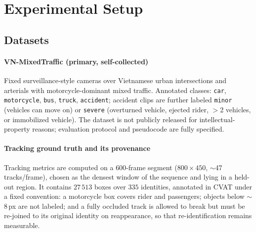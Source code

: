 
\section{Experimental Setup}
\label{sec:experiments}

\subsection{Datasets}
\label{subsec:datasets}

\paragraph{VN-MixedTraffic (primary, self-collected)}
Fixed surveillance-style cameras over Vietnamese urban intersections
and arterials with motorcycle-dominant mixed traffic.
Annotated classes: \texttt{car}, \texttt{motorcycle}, \texttt{bus},
\texttt{truck}, \texttt{accident}; accident clips are further labeled
\texttt{minor} (vehicles can move on) or \texttt{severe} (overturned
vehicle, ejected rider, $>$2 vehicles, or immobilized vehicle).
The dataset is not publicly released for intellectual-property
reasons; evaluation protocol and pseudocode are fully specified.

\paragraph{Tracking ground truth and its provenance}
Tracking metrics are computed on a $600$-frame segment
($800\times450$, $\sim$47 tracks/frame), chosen as the densest window of
the sequence and lying in a held-out region.
It contains $27\,513$ boxes over $335$ identities, annotated in CVAT
under a fixed convention: a motorcycle box covers rider and passengers;
objects below $\sim$8\,px are not labeled; and a fully occluded track is
allowed to break but must be re-joined to its original identity on
reappearance, so that re-identification remains measurable.

